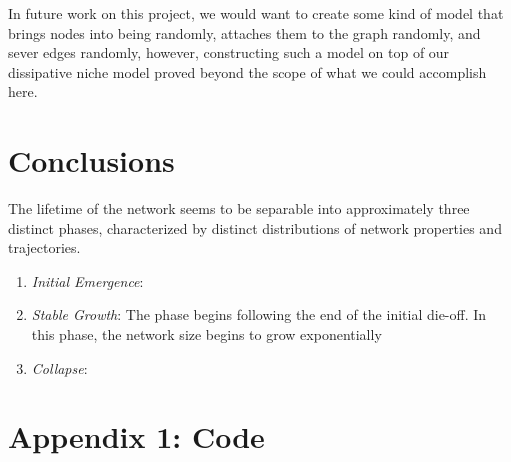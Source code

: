 \documentclass{paper}
\begin{document}
	In future work on this project, we would want to create some kind of model that brings nodes into being randomly, attaches them to the graph randomly, and sever edges randomly, however, constructing such a model on top of our dissipative niche model proved beyond the scope of what we could accomplish here. 
	
	
	\section{Conclusions}
	
	The lifetime of the network seems to be separable into approximately three distinct phases, characterized by distinct distributions of network properties and trajectories. 
	\begin{enumerate}
		\item \textit{Initial Emergence}:
		\item \textit{Stable Growth}: The phase begins following the end of the initial die-off. In this phase, the network size begins to grow exponentially
		\item \textit{Collapse}:
	\end{enumerate}
	
	
	
	
	\section{Appendix 1: Code}
	
\end{document}
